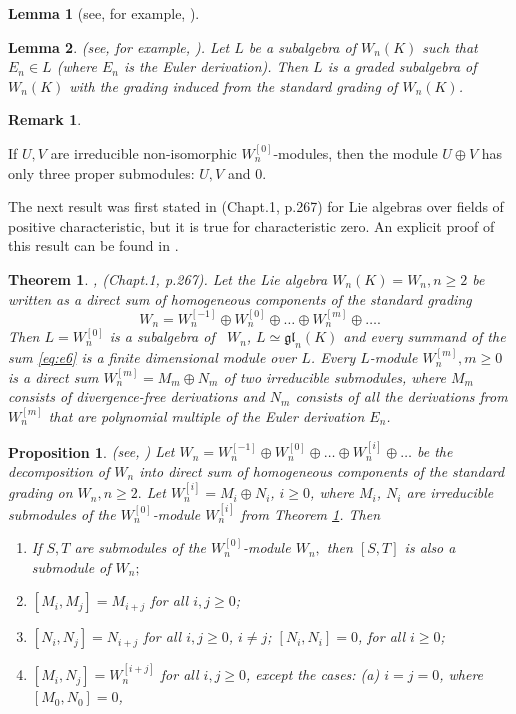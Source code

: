 \documentclass[12pt,a4paper]{amsart}
\theoremstyle{plain}
\newtheorem{theorem}{Theorem}
\newtheorem{lemma}{Lemma}
\newtheorem{proposition}{Proposition}
\theoremstyle{definition}
\newtheorem{remark}{Remark}
\begin{document}
{\begin{lemma}[see, for example,  \cite{Now}]
	\end{lemma}
	
	
	\begin{lemma} \label{lm:graded} (see, for example, \cite{CP25}).
		Let $L$ be a subalgebra of $W_n({K})$ such that $E_n \in L$ (where $E_n$ is the Euler derivation). Then $L$ is a graded subalgebra of $W_n({K})$ with the grading induced from the standard grading of $W_n({K})$.
	\end{lemma}
	
	\begin{remark}\label{2modules}
		
		If $U, V$ are irreducible non-isomorphic $W_n^{[0]}$-modules, then the module $U\oplus V$ has only three proper submodules:   $U, V$ and $0$.
	\end{remark}
	The  next result  was first stated in \cite{KS} (Chapt.1, p.267)  for Lie algebras over fields  of positive characteristic, but it is true  for characteristic zero. An explicit proof of this result can  be found in \cite{CP25}.
	\begin{theorem}\label{ThKS}\cite{KS}, (Chapt.1, p.267).
		Let the Lie algebra $W_n(K) = W_n, n\geq 2$ be written as a direct sum of homogeneous 
		components of the standard grading
		\begin{equation} \label{eq:e6}
			W_n = W_n^{[-1]} \oplus W_n^{[0]} \oplus \dots \oplus W_n^{[m]} \oplus \dots.
		\end{equation}
		Then $L = W_n^{[0]}$ is a subalgebra of \  $W_n$, $L \simeq \mathfrak{gl}_n(K)$
		and every summand of the sum \eqref{eq:e6} is a finite dimensional module over $L$.
		Every $L$-module $W_n^{[m]}, m \ge 0$ is a direct sum $W_n^{[m]} = M_m \oplus N_m$
		of two irreducible submodules, where $M_m$ consists of divergence-free derivations and $N_m$
		consists of all the derivations from $W_n^{[m]}$ that are polynomial multiple of the Euler derivation $E_n$.
	\end{theorem}	
	
	\begin{proposition}\label{products} (see, \cite{CP25})
		Let $W_n = W_{n}^{[-1]}\oplus W_{n}^{[0]}\oplus\dots\oplus W_{n}^{[i]}\oplus\dots$ be the decomposition of $ W_n $ into  direct sum of homogeneous components of the standard grading on $W_{n}, n\geq 2.$ Let $W_{n}^{[i]}=M_{i}\oplus N_{i}$, $i\ge 0$, where $M_{i}$, $N_{i}$ are irreducible submodules of the $W_{n}^{[0]}$-module $W_{n}^{[i]}$ from Theorem \ref{ThKS}. Then
		\begin{enumerate}
			\item If  $S, T$ are submodules of the $W_n^{[0]}$-module $W_n,$ then $[S,  T] $ is also a submodule of $W_n;$
			\item $[M_{i}, M_{j}] = M_{i+j}$ for all $i,j\ge 0$;
			\item $[N_{i}, N_{j}] = N_{i+j}$ for all $i,j\ge 0$, $i\ne j$; $[N_{i}, N_{i}] = 0$, for all $i\ge 0$;
			\item $[M_{i}, N_{j}] = W_{n}^{[i+j]}$ for all $i,j\ge 0$, except the cases:
			(a) $i=j=0$, where $[M_{0}, N_{0}] = 0$, 
			

\end{enumerate}
\end{proposition}}
\end{document}
